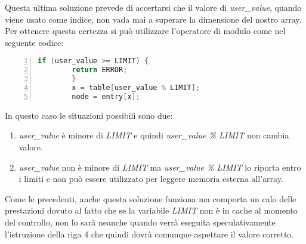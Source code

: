 		Questa ultima soluzione prevede di accertarsi che il valore di \emph{user\_value}, quando viene usato come indice, non vada mai a superare la dimensione del nostro array. Per ottenere questa certezza si può utilizzare l'operatore di modulo come nel seguente codice:
		
		\begin{lstlisting}[language={C},frame={rlbt},basicstyle=\footnotesize,numbers=left,numberstyle=\scriptsize\color{black}]
		if (user_value >= LIMIT) {
		return ERROR;
		}
		x = table[user_value % LIMIT]; 
		node = entry[x];
		\end{lstlisting}
		
		In questo caso le situazioni possibili sono due:
		
		\begin{enumerate}
			\item \emph{user\_value} è minore di \emph{LIMIT} e quindi \emph{user\_value \% LIMIT} non cambia valore.
			\item \emph{user\_value} non è minore di \emph{LIMIT} ma \emph{user\_value \% LIMIT} lo riporta entro i limiti e non può essere utilizzato per leggere memoria esterna all'array.
		\end{enumerate}
	
		Come le precedenti, anche questa soluzione funziona ma comporta un calo delle prestazioni dovuto al fatto che se la variabile \emph{LIMIT} non è in cache al momento del controllo, non lo sarà neanche quando verrà eseguita speculativamente l'istruzione della riga 4 che quindi dovrà comunque aspettare il valore corretto. 